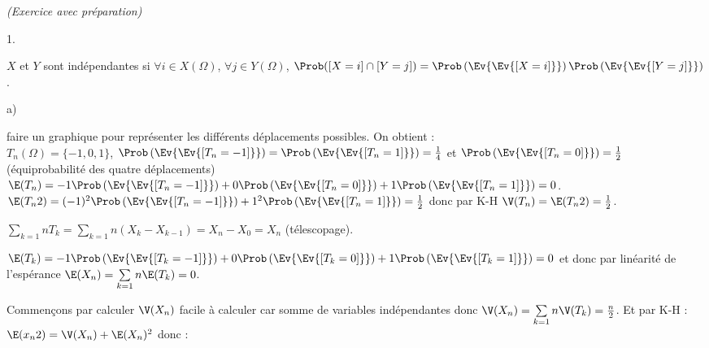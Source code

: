 \documentclass[11pt]{article}%
\begin{document}
 \begin{exercice}{\it (Exercice avec préparation)}~
 \begin{noliste}{1.}
 \setlength{\itemsep}{4mm}
 \item $X$ et $Y$ sont indépendantes si $\forall i \in X(\Omega)$,
$\forall j \in Y(\Omega)$, $\Prob([X = i] \cap [Y = j]) =
\Prob\left(\Ev{\Ev{[X = i]}}\right) \Prob\left(\Ev{\Ev{[Y =
j]}}\right)$.
 \item \begin{noliste}{a)}
 \setlength{\itemsep}{2mm}
 \item faire un graphique pour représenter les différents déplacements
possibles. On obtient : \\
 $T_{n}(\Omega) = \{-1,0,1\}$, $\Prob\left(\Ev{\Ev{[T_{n} =
-1]}}\right) = \Prob\left(\Ev{\Ev{[T_{n} = 1]}}\right) = \frac{1}{4}$
et $\Prob\left(\Ev{\Ev{[T_{n} = 0]}}\right) = \frac{1}{2} $
(équiprobabilité des quatre déplacements)
 $\E(T_{n}) = -1 \Prob\left(\Ev{\Ev{[T_{n} = -1]}}\right) +
0\Prob\left(\Ev{\Ev{[T_{n} = 0]}}\right) + 1\Prob\left(\Ev{\Ev{[T_{n} =
1]}}\right) = 0$.\\
 $\E(T_{n}{2}) = (-1)^{2} \Prob\left(\Ev{\Ev{ [T_{n} = -1]}}\right) +
1^{2} \Prob\left(\Ev{\Ev{[T_{n} = 1]}}\right) = \frac{1}{2}$ donc par
K-H $\V(T_{n}) = \E(T_{n}{2}) = \frac{1}{2}$. 
 \item $\sum \limits_{k = 1}{n} T_{k} = \sum \limits_{k = 1}{n}
(X_{k}-X_{k-1}) = X_{n}-X_{0} = X_{n}$ (télescopage).
 \item $\E(T_{k}) = -1 \Prob\left(\Ev{\Ev{[T_{k} = -1]}}\right) +
0\Prob\left(\Ev{\Ev{[T_{k} = 0]}}\right) + 1\Prob\left(\Ev{\Ev{[T_{k} =
1]}}\right) = 0$ et donc par linéarité de l'espérance $\E(X_{n}) = \sum
\limits_{k = 1}{n} \E(T_{k}) = 0$.
 \item Commençons par calculer $\V(X_{n})$ facile à calculer car somme
de variables indépendantes donc $\V(X_{n}) = \sum \limits_{k = 1}{n}
\V(T_{k}) = \frac{n}{2}$. Et par K-H : $\E(x_{n}{2}) = \V(X_{n}) +
\E(X_{n})^{2}$ donc :
 

\end{noliste}
\end{noliste}
\end{exercice}
\end{document}
